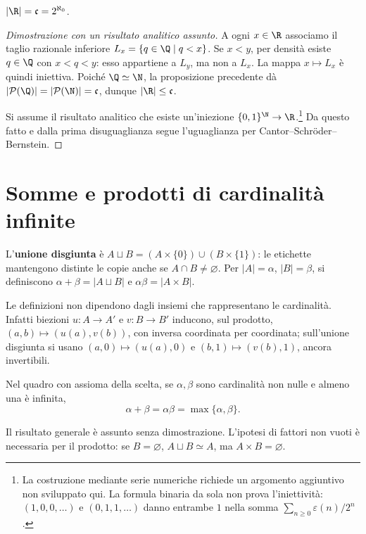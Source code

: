 \begin{teorema}\label{teo:continuo}
$|\R|=\mathfrak c=2^{\aleph_0}$.
\end{teorema}
\begin{proof}[Dimostrazione con un risultato analitico assunto]
 A ogni $x\in\R$ associamo il taglio razionale inferiore $L_x=\{q\in\Q\mid q<x\}$. Se $x<y$, per densità esiste $q\in\Q$ con $x<q<y$: esso appartiene a $L_y$, ma non a $L_x$. La mappa $x\mapsto L_x$ è quindi iniettiva. Poiché $\Q\simeq\N$, la proposizione precedente dà $|\mathcal P(\Q)|=|\mathcal P(\N)|=\mathfrak c$, dunque $|\R|\le\mathfrak c$.

 Si assume il risultato analitico che esiste un'iniezione $\{0,1\}^{\N}\to\R$.\footnote{La costruzione mediante serie numeriche richiede un argomento aggiuntivo non sviluppato qui. La formula binaria da sola non prova l'iniettività: $(1,0,0,\ldots)$ e $(0,1,1,\ldots)$ danno entrambe $1$ nella somma $\sum_{n\ge0}\varepsilon(n)/2^n$.} Da questo fatto e dalla prima disuguaglianza segue l'uguaglianza per Cantor--Schröder--Bernstein.
\end{proof}

\section{Somme e prodotti di cardinalità infinite}
\begin{definizione}
L'\textbf{unione disgiunta} è $A\sqcup B=(A\times\{0\})\cup(B\times\{1\})$: le etichette mantengono distinte le copie anche se $A\cap B\ne\varnothing$. Per $|A|=\alpha$, $|B|=\beta$, si definiscono $\alpha+\beta=|A\sqcup B|$ e $\alpha\beta=|A\times B|$.
\end{definizione}

Le definizioni non dipendono dagli insiemi che rappresentano le cardinalità. Infatti biezioni $u:A\to A'$ e $v:B\to B'$ inducono, sul prodotto, $(a,b)\mapsto(u(a),v(b))$, con inversa coordinata per coordinata; sull'unione disgiunta si usano $(a,0)\mapsto(u(a),0)$ e $(b,1)\mapsto(v(b),1)$, ancora invertibili.

\begin{teorema}
Nel quadro con assioma della scelta, se $\alpha,\beta$ sono cardinalità non nulle e almeno una è infinita,
\[
\alpha+\beta=\alpha\beta=\max\{\alpha,\beta\}.
\]
\end{teorema}
Il risultato generale è assunto senza dimostrazione. L'ipotesi di fattori non vuoti è necessaria per il prodotto: se $B=\varnothing$, $A\sqcup B\simeq A$, ma $A\times B=\varnothing$.
